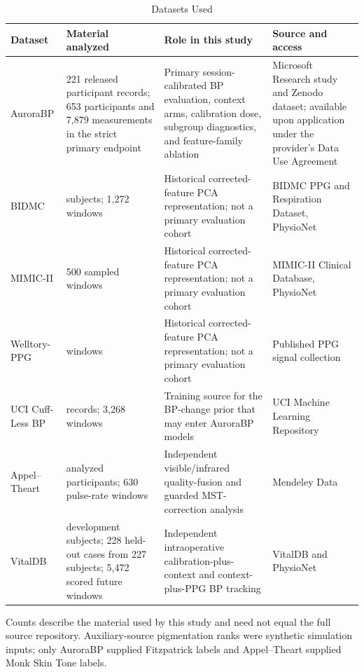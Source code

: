 \documentclass[12pt]{article}
\let\cite\citep
\begin{document}
\begin{table}[t]
\centering
\caption{Datasets Used}
\label{tab:datasetsummary}
\scriptsize
\renewcommand{\arraystretch}{1.12}
\begin{tabular}{>{\raggedright\arraybackslash}p{1.7cm}>{\raggedright\arraybackslash}p{3.0cm}>{\raggedright\arraybackslash}p{4.4cm}>{\raggedright\arraybackslash}p{5.2cm}}
\toprule
Dataset & Material analyzed & Role in this study & Source and access \\
\midrule
AuroraBP & 1{,}221 released participant records; 653 participants and 7{,}879 measurements in the strict primary endpoint & Primary session-calibrated BP evaluation, context arms, calibration dose, subgroup diagnostics, and feature-family ablation & Microsoft Research study and Zenodo dataset; available upon application under the provider's Data Use Agreement \cite{aurorabp2022,aurorabpDataset} \\
BIDMC & 53 subjects; 1{,}272 windows & Historical corrected-feature PCA representation; not a primary evaluation cohort & BIDMC PPG and Respiration Dataset, PhysioNet \cite{bidmcDataset,pimentel2017,physionet2000} \\
MIMIC-II & 1{,}500 sampled windows & Historical corrected-feature PCA representation; not a primary evaluation cohort & MIMIC-II Clinical Database, PhysioNet \cite{mimicii2011,mimiciiDataset,physionet2000} \\
Welltory-PPG & 106 windows & Historical corrected-feature PCA representation; not a primary evaluation cohort & Published PPG signal collection \cite{welltory2021} \\
UCI Cuff-Less BP & 425 records; 3{,}268 windows & Training source for the BP-change prior that may enter AuroraBP models & UCI Machine Learning Repository \cite{uciCufflessDataset,kachuee2015} \\
Appel--Theart & 108 analyzed participants; 630 pulse-rate windows & Independent visible/infrared quality-fusion and guarded MST-correction analysis & Mendeley Data \cite{appel2025ppg} \\
VitalDB & 55 development subjects; 228 held-out cases from 227 subjects; 5{,}472 scored future windows & Independent intraoperative calibration-plus-context and context-plus-PPG BP tracking & VitalDB and PhysioNet \cite{lee2022vitaldb,vitaldbDataset} \\
\bottomrule
\end{tabular}
\begin{minipage}{0.96\textwidth}
\vspace{2pt}\footnotesize Counts describe the material used by this study and need not equal the full source repository. Auxiliary-source pigmentation ranks were synthetic simulation inputs; only AuroraBP supplied Fitzpatrick labels and Appel--Theart supplied Monk Skin Tone labels.
\end{minipage}
\end{table}
\end{document}

